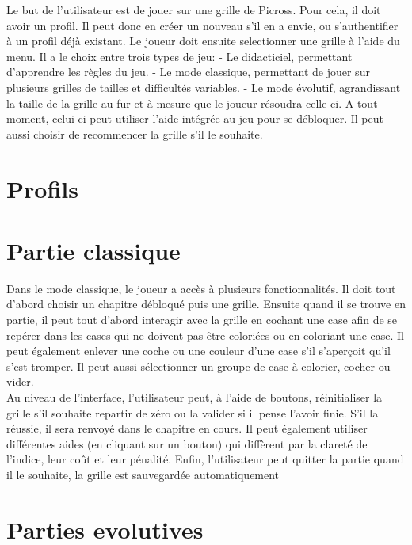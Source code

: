 \documentclass{report}
\begin{document}
	Le but de l'utilisateur est de jouer sur une grille de Picross.
Pour cela, il doit avoir un profil. Il peut donc en créer un nouveau s'il en a envie, ou s'authentifier à un profil déjà existant.
	Le joueur doit ensuite selectionner une grille à l'aide du menu. Il a le choix entre trois types de jeu:
	- Le didacticiel, permettant d'apprendre les règles du jeu. 
	- Le mode classique, permettant de jouer sur plusieurs grilles de tailles et difficultés variables.
	- Le mode évolutif, agrandissant la taille de la grille au fur et à mesure que le joueur résoudra celle-ci.
	A tout moment, celui-ci peut utiliser l'aide intégrée au jeu pour se débloquer. Il peut aussi choisir de recommencer la grille s'il le souhaite.

      
	\section{Profils}
	
	
	
	\section{Partie classique}
	
	Dans le mode classique, le joueur a accès à plusieurs fonctionnalités. Il doit tout d'abord choisir un chapitre débloqué puis une grille. Ensuite quand il se trouve en partie, il peut tout d'abord interagir avec la grille en cochant une case afin de se repérer dans les cases qui ne doivent pas être coloriées ou en coloriant une case. Il peut également enlever une coche ou une couleur d'une case s'il s'aperçoit qu'il s'est tromper. Il peut aussi sélectionner un groupe de case à colorier, cocher ou vider. \\
Au niveau de l'interface, l'utilisateur peut, à l'aide de boutons, réinitialiser la grille s'il souhaite repartir de zéro ou la valider si il pense l'avoir finie. S'il la réussie, il sera renvoyé dans le chapitre en cours. Il peut également utiliser différentes aides (en cliquant sur un bouton) qui diffèrent par la clareté de l'indice, leur coût et leur pénalité. Enfin, l'utilisateur peut quitter la partie quand il le souhaite, la grille est sauvegardée automatiquement\\
	
	\section{Parties evolutives}
	
\end{document}
